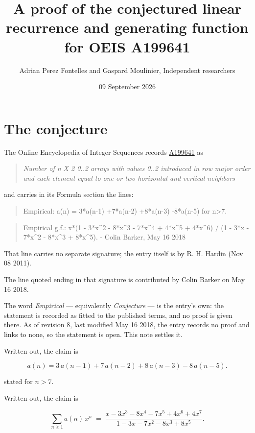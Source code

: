 \documentclass[11pt]{article}
\title{A proof of the conjectured linear recurrence and generating function for OEIS A199641}
\author{Adrian Perez Fontelles and Gaspard Moulinier, Independent researchers}
\date{09 September 2026}
\theoremstyle{definition}
\begin{document}
\maketitle
\section{The conjecture}

The Online Encyclopedia of Integer Sequences records \href{https://oeis.org/A199641}{A199641} as

\begin{quote}\itshape Number of n X 2 0..2 arrays with values 0..2 introduced in row major order and each element equal to one or two horizontal and vertical neighbors\end{quote}

and carries in its Formula section the lines:

\begin{quote}\ttfamily Empirical: a(n) = 3*a(n-1) +7*a(n-2) +8*a(n-3) -8*a(n-5) for n>7.\end{quote}

\begin{quote}\ttfamily Empirical g.f.: x*(1 - 3*x\textasciicircum{}2 - 8*x\textasciicircum{}3 - 7*x\textasciicircum{}4 + 4*x\textasciicircum{}5 + 4*x\textasciicircum{}6) / (1 - 3*x - 7*x\textasciicircum{}2 - 8*x\textasciicircum{}3 + 8*x\textasciicircum{}5). - Colin Barker, May 16 2018\end{quote}

That line carries no separate signature; the entry itself is by R. H. Hardin (Nov 08 2011).

The line quoted ending in that signature is contributed by Colin Barker on May 16 2018.

The word {\itshape Empirical} --- equivalently {\itshape Conjecture} --- is the entry's own: the statement is recorded as fitted to the published terms, and no proof is given there. As of revision 8, last modified May 16 2018, the entry records no proof and links to none, so the statement is open. This note settles it.

Written out, the claim is

\[a(n) = 3\,a(n-1) + 7\,a(n-2) + 8\,a(n-3) - 8\,a(n-5).\]

stated for $n > 7$.

Written out, the claim is

\[\sum_{n \ge 1} a(n)\,x^n \;=\; \frac{x - 3x^{3} - 8x^{4} - 7x^{5} + 4x^{6} + 4x^{7}}{1 - 3x - 7x^{2} - 8x^{3} + 8x^{5}}.\]
\end{document}
